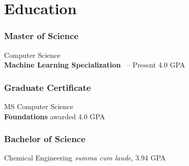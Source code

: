 %
%
%
%
\section{Education}
  \subsubsection{Master of Science} 
  \school%
    {Computer Science \\ \bf{Machine Learning Specialization}}%
    {\SchoolA}%
    {\SchoolAdate \ -- Present}%
    {4.0 GPA}
%
%
  {\vspace{-1em}}
%
%
  \subsubsection{Graduate Certificate}
  \school%
    {MS Computer Science \\ \bf{Foundations}}%
    {\SchoolB}%
    {awarded \SchoolBdate}%
    {4.0 GPA}
%
%
  {\vspace{-1em}}
%
%
  \subsubsection{Bachelor of Science}
  \school%
    {Chemical Engineering}%
    {\SchoolC}%
    {\textit{summa cum laude}, \SchoolCdate}%
    {3.94 GPA}
%
%
%